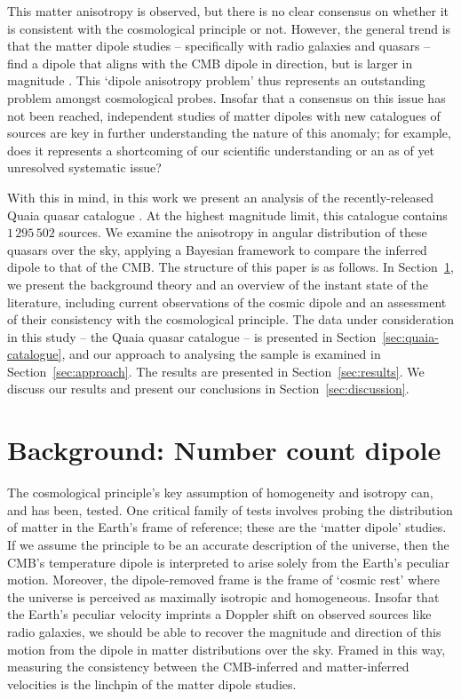 \documentclass[fleqn,usenatbib]{mnras}
\begin{document}
    This matter anisotropy is observed, but there is no clear consensus on whether it is consistent with the cosmological principle or not.
    However, the general trend is that the matter dipole studies -- specifically with radio galaxies and quasars -- find a dipole that aligns with the CMB dipole in direction, but is larger in magnitude \citep{Peebles_2022, aluri2023}.
    This `dipole anisotropy problem' thus represents an outstanding problem amongst cosmological probes.
    Insofar that a consensus on this issue has not been reached, independent studies of matter dipoles with new catalogues of sources are key in further understanding the nature of this anomaly; for example, does it represents a shortcoming of our scientific understanding or an as of yet unresolved systematic issue?

    With this in mind, in this work we present an analysis of the recently-released Quaia quasar catalogue \citep{storeyfisher2023quaia}.
    At the highest magnitude limit, this catalogue contains $1\,295\,502$ sources.
    We examine the anisotropy in angular distribution of these quasars over the sky, applying a Bayesian framework to compare the inferred dipole to that of the CMB.
    The structure of this paper is as follows.
    In Section~\ref{sec:background}, we present the background theory and an overview of the instant state of the literature, including current observations of the cosmic dipole and an assessment of their consistency with the cosmological principle.
    The data under consideration in this study -- the Quaia quasar catalogue -- is presented in Section~\ref{sec:quaia-catalogue}, and our approach to analysing the sample is examined in Section~\ref{sec:approach}.
    The results are presented in Section~\ref{sec:results}.
    We discuss our results and present our conclusions in Section~\ref{sec:discussion}.

\section{Background: Number count dipole}\label{sec:background}
    The cosmological principle's key assumption of homogeneity and isotropy can, and has been, tested.
    One critical family of tests involves probing the distribution of matter in the Earth's frame of reference; these are the `matter dipole' studies.
    If we assume the principle to be an accurate description of the universe, then the CMB's temperature dipole is interpreted to arise solely from the Earth's peculiar motion.
    Moreover, the dipole-removed frame is the frame of `cosmic rest' where the universe is perceived as maximally isotropic and homogeneous.
    Insofar that the Earth's peculiar velocity imprints a Doppler shift on observed sources like radio galaxies, we should be able to recover the magnitude and direction of this motion from the dipole in matter distributions over the sky.
    Framed in this way, measuring the consistency between the CMB-inferred and matter-inferred velocities is the linchpin of the matter dipole studies.
\end{document}
